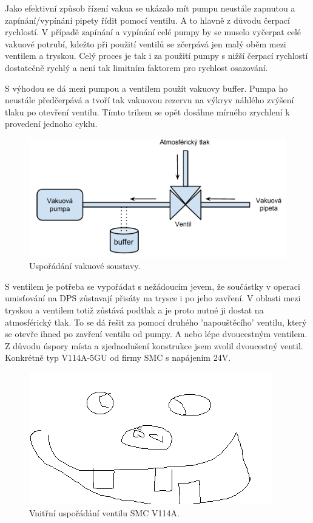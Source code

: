Jako efektivní způsob řízení vakua se ukázalo mít pumpu neustále zapnutou a zapínání/vypínání pipety řídit pomocí ventilu. A to hlavně z důvodu čerpací rychlostí. V případě zapínání a vypínání celé pumpy by se muselo vyčerpat celé vakuové potrubí, kdežto při použití ventilů se zčerpává jen malý oběm mezi ventilem a tryskou. Celý proces je tak i za použití pumpy s nižší čerpací rychlostí dostatečně rychlý a není tak limitním faktorem pro rychlost osazování.

S výhodou se dá mezi pumpou a ventilem použít vakuovy buffer. Pumpa ho neustále předčerpává a tvoří tak vakuovou rezervu na výkryv náhlého zvýšení tlaku po otevření ventilu. Tímto trikem se opět dosáhne mírného zrychlení k provedení jednoho cyklu.

\begin{figure}[h!]
  \centering
    \includegraphics[width=0.8\linewidth]{pdf/vacdiagram2.pdf}%
    \caption{Uspořádání vakuové soustavy.}
    \label{fig:vacuum}
\end{figure}


S ventilem je potřeba se vypořádat s nežádoucím jevem, že součástky v operaci umisťování na DPS zůstavají přisáty na trysce i po jeho zavření. V oblasti mezi tryskou a ventilem totiž zůstává podtlak a je proto nutné ji dostat na atmosférický tlak. To se dá řešit za pomocí druhého 'napouštěcího' ventilu, který se otevře ihned po zavření ventilu od pumpy. A nebo lépe dvoucestným ventilem. Z důvodu úspory místa a zjednodušení konstrukce jsem zvolil dvoucestný ventil. Konkrétně typ V114A-5GU od firmy SMC s napájením 24V.

\begin{figure}[h!]
  \centering
    \includegraphics[width=0.3\linewidth]{obrazky/placeholder.png}%
    \caption{Vnitřní uspořádání ventilu SMC V114A.}
    \label{fig:ventil}
\end{figure}

